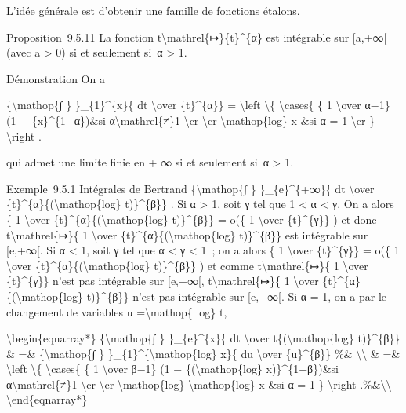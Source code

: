 \documentclass[]{article}
\begin{document}
L'idée générale est d'obtenir une famille de fonctions étalons.

Proposition~9.5.11 La fonction
t\textbackslash{}mathrel\{↦\}\{t\}\^{}\{α\} est intégrable sur
{[}a,+∞{[} (avec a \textgreater{} 0) si et seulement si~α \textgreater{}
1.

Démonstration On a

\{\textbackslash{}mathop\{∫ \} \}\_\{1\}\^{}\{x\}\{ dt
\textbackslash{}over \{t\}\^{}\{α\}\} = \textbackslash{}left
\textbackslash{}\{ \textbackslash{}cases\{ \{ 1 \textbackslash{}over
α−1\} (1 − \{x\}\^{}\{1−α\})\&si α\textbackslash{}mathrel\{≠\}1
\textbackslash{}cr \textbackslash{}cr \textbackslash{}mathop\{log\} x
\&si α = 1 \textbackslash{}cr \} \textbackslash{}right .

qui admet une limite finie en + ∞ si et seulement si~α \textgreater{} 1.

Exemple~9.5.1 Intégrales de Bertrand \{\textbackslash{}mathop\{∫ \}
\}\_\{e\}\^{}\{+∞\}\{ dt \textbackslash{}over
\{t\}\^{}\{α\}\{(\textbackslash{}mathop\{log\} t)\}\^{}\{β\}\} . Si α
\textgreater{} 1, soit γ tel que 1 \textless{} α \textless{} γ. On a
alors \{ 1 \textbackslash{}over
\{t\}\^{}\{α\}\{(\textbackslash{}mathop\{log\} t)\}\^{}\{β\}\} = o(\{ 1
\textbackslash{}over \{t\}\^{}\{γ\}\} ) et donc
t\textbackslash{}mathrel\{↦\}\{ 1 \textbackslash{}over
\{t\}\^{}\{α\}\{(\textbackslash{}mathop\{log\} t)\}\^{}\{β\}\} est
intégrable sur {[}e,+∞{[}. Si α \textless{} 1, soit γ tel que α
\textless{} γ \textless{} 1~; on a alors \{ 1 \textbackslash{}over
\{t\}\^{}\{γ\}\} = o(\{ 1 \textbackslash{}over
\{t\}\^{}\{α\}\{(\textbackslash{}mathop\{log\} t)\}\^{}\{β\}\} ) et
comme t\textbackslash{}mathrel\{↦\}\{ 1 \textbackslash{}over
\{t\}\^{}\{γ\}\} n'est pas intégrable sur {[}e,+∞{[},
t\textbackslash{}mathrel\{↦\}\{ 1 \textbackslash{}over
\{t\}\^{}\{α\}\{(\textbackslash{}mathop\{log\} t)\}\^{}\{β\}\} n'est pas
intégrable sur {[}e,+∞{[}. Si α = 1, on a par le changement de variables
u =\textbackslash{}mathop\{ log\} t,

\textbackslash{}begin\{eqnarray*\} \{\textbackslash{}mathop\{∫ \}
\}\_\{e\}\^{}\{x\}\{ dt \textbackslash{}over
t\{(\textbackslash{}mathop\{log\} t)\}\^{}\{β\}\} \& =\&
\{\textbackslash{}mathop\{∫ \}
\}\_\{1\}\^{}\{\textbackslash{}mathop\{log\} x\}\{ du
\textbackslash{}over \{u\}\^{}\{β\}\} \%\&
\textbackslash{}\textbackslash{} \& =\& \textbackslash{}left
\textbackslash{}\{ \textbackslash{}cases\{ \{ 1 \textbackslash{}over
β−1\} (1 − \{(\textbackslash{}mathop\{log\} x)\}\^{}\{1−β\})\&si
α\textbackslash{}mathrel\{≠\}1 \textbackslash{}cr \textbackslash{}cr
\textbackslash{}mathop\{log\} \textbackslash{}mathop\{log\} x \&si α = 1
\} \textbackslash{}right .\%\&\textbackslash{}\textbackslash{}
\textbackslash{}end\{eqnarray*\}
\end{document}
